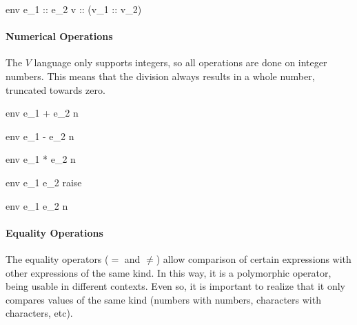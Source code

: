\documentclass{article}
\begin{document}
    {\mbox{env} \vdash e_1 :: e_2 \Downarrow v :: (v_1 :: v_2)}


\paragraph{Numerical Operations}
The $V$ language only supports integers, so all operations are done on integer numbers.
This means that the division always results in a whole number, truncated towards zero.

\medskip

    {\mbox{env} \vdash e_1 + e_2 \Downarrow n}

    {\mbox{env} \vdash e_1 - e_2 \Downarrow n}

    {\mbox{env} \vdash e_1 * e_2 \Downarrow n}

    {\mbox{env} \vdash e_1 \div e_2 \Downarrow raise}

    {\mbox{env} \vdash e_1 \div e_2 \Downarrow n}

\paragraph{Equality Operations}
The equality operators ($=$ and $\neq$) allow comparison of certain expressions with other expressions of the same kind.
In this way, it is a polymorphic operator, being usable in different contexts.
Even so, it is important to realize that it only compares values of the same kind (numbers with numbers, characters with characters, etc).

\medskip
\end{document}
